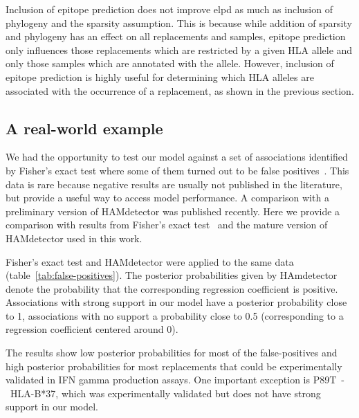 \documentclass[fleqn,11pt]{SelfArx} %
\begin{document}
Inclusion of epitope prediction does not improve elpd as much as inclusion of phylogeny and the sparsity assumption. This is because while addition of sparsity and phylogeny has an effect on all replacements and samples, epitope prediction only influences those replacements which are restricted by a given HLA allele and only those samples which are annotated with the allele. However, inclusion of epitope prediction is highly useful for determining which HLA alleles are associated with the occurrence of a replacement, as shown in the previous section.


\subsection{A real-world example}

We had the opportunity to test our model against a set of associations identified by Fisher's exact test where some of them turned out to be false positives~\cite{Karimzadeh2019}. This data is rare because negative results are usually not published in the literature, but provide a useful way to access model performance.
A comparison with a preliminary version of HAMdetector was published recently. Here we provide a comparison with results from Fisher's exact test~\cite{Budeus2016} and the mature version of HAMdetector used in this work.

Fisher's exact test and  HAMdetector were applied to the same data (table~\ref{tab:false-positives}).
The posterior probabilities given by HAmdetector denote the probability that the corresponding regression coefficient is positive. Associations with strong support in our model have a posterior probability close to 1, associations with no support a probability close to 0.5 (corresponding to a regression coefficient centered around 0).

The results show low posterior probabilities for most of the false-positives and high posterior probabilities for most replacements that could be experimentally validated in IFN gamma production assays.
One important exception is P89T~-~HLA-B*37, which was experimentally validated but does not have strong support in our model.
\end{document}
